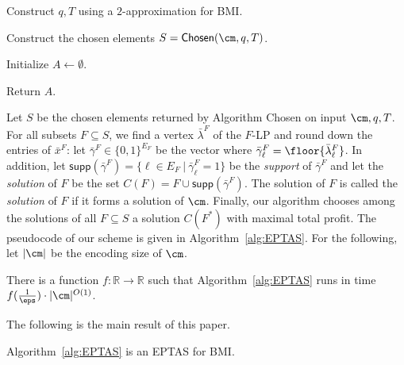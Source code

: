  \begin{algorithm}[h]
	\caption{$\textsf{EPTAS}(\cm = (E,\cI,s,p),\eps)$}
	\label{alg:EPTAS}
	
	Construct $q,T$ using a $2$-approximation for BMI. 
	
	Construct the chosen elements $S = \textsf{Chosen}(\cm,q,T)$. 
	
	
	Initialize $A \leftarrow \emptyset$.\label{step:init}
	
	
	Return $A$. 
\end{algorithm}

Let $S$ be the chosen elements returned by Algorithm \textsf{Chosen} on input $\cm,q,T$. For all subsets $F \subseteq S$, we find a vertex $\bar{\lambda}^F$ of the $F$-LP and round down the entries of $\bar{x}^F$: let $\bar{\gamma}^F \in \{0,1\}^{E_F}$ be the vector where $\bar{\gamma}^F_{\ell} = \floor{\bar{\lambda}^F_{\ell}}$.  In addition, let $\textsf{supp}\left(\bar{\gamma}^F\right) = \{\ell \in E_F~|~ \bar{\gamma}^F_{\ell} = 1\}$ be the {\em support} of $\bar{\gamma}^F$ and let the  {\em solution} of $F$ be the set $C(F) = F \cup \textsf{supp}\left(\bar{\gamma}^F\right)$. The solution of $F$ is called the {\em solution } of $F$ if it forms a solution of $\cm$. Finally, our algorithm chooses among the solutions of all $F \subseteq S$ a solution $C(F^*)$ with maximal total profit. The pseudocode of our scheme is given in Algorithm~\ref{alg:EPTAS}. For the following, let $|\cm|$ be the encoding size of $\cm$. 


\begin{lemma}
	\label{lem:runningTime}
	There is a function $f:\mathbb{R} \rightarrow \mathbb{R}$ such that Algorithm~\ref{alg:EPTAS} runs in time $f(\frac{1}{\eps}) \cdot |\cm|^{O(1)}$. 
\end{lemma} The following is the main result of this paper. 

\begin{theorem}
	Algorithm~\ref{alg:EPTAS} is an EPTAS for BMI.
\end{theorem}

